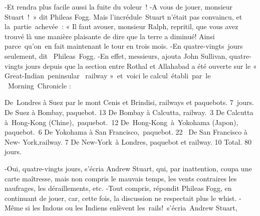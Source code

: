 \documentclass[]{book}
\begin{document}
               -Et rendra plus facile aussi la fuite du 
               voleur !\newline
               -A vous de jouer, monsieur Stuart ! »
               dit Phileas Fogg.\newline
               Mais l’incrédule Stuart n'était pas convaincu, et la partie achevée :
               « Il faut avouer, monsieur Ralph, repritil, que vous avez trouvé là une manière 
               plaisante de dire que la terre a diminué!
               Ainsi parce qu'on en fait maintenant le 
               tour en trois mois.\newline
               -En quatre-vingts jours seulement, dit 
               Phileas Fogg.\newline
               -En effet, messieurs, ajouta John Sullivan, quatre-vingts jours depuis que la
               section entre Rothal et Allahabad a été 
               ouverte sur le « Great-Indian peninsular
                railway » et voici le calcul établi par le
                Morning Chronicle :
                  
               De Londres à Suez par le mont Cenis et
               Brindisi, railways et paquebots. 7 jours.
               De Suez à Bombay, paquebot. 13 
               De Bombay à Calcutta\index[placeName]{{}}, railway. 3 
               De Calcutta à Hong-Kong\index[placeName]{{}} (Chine), paquebot. 12 
               De Hong-Kong\index[placeName]{{}} à Yokohama (Japon), paquebot. 6
               De Yokohama à San Francisco, paquebot. 22 
               De San Francisco à New- York,railway. 7 
               De New-York à Londres, paquebot et railway. 10 
               Total. 80 jours.\newline
            
               -Oui, quatre-vingts jours, s'écria Andrew Stuart, qui, par inattention, coupa 
               une carte maîtresse, mais non compris le 
               mauvais temps, les vents contraires les
               naufrages, les déraillements, etc.\newline
               -Tout compris, répondit Phileas Fogg,
               en continuant de jouer, car, cette fois, la 
               discussion ne respectait plus le whist.\newline
               -Même si les Indous ou les Indiens enlèvent les rails! s’écria Andrew Stuart,
                  
\end{document}
